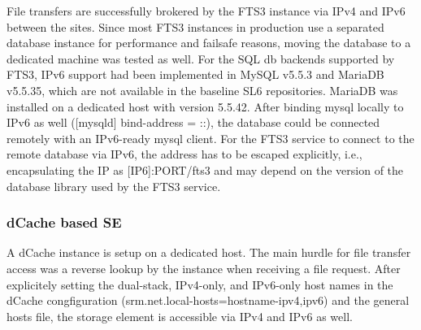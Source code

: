 File transfers are successfully brokered by the FTS3 instance via IPv4 and IPv6 between the sites. Since most FTS3 instances in production use a separated database instance for performance and failsafe reasons, moving the database to a dedicated machine was tested as well. For the SQL db backends supported by FTS3, IPv6 support had been implemented in MySQL v5.5.3 and MariaDB v5.5.35, which are not available in the baseline SL6 repositories. MariaDB was installed on a dedicated host with version 5.5.42. After binding mysql locally to IPv6 as well ([mysqld] bind-address = ::), the database could be connected remotely with an IPv6-ready mysql client. For the FTS3 service to connect to the remote database via IPv6, the address has to be escaped explicitly, i.e., encapsulating the IP as [IP6]:PORT/fts3 and may depend on the version of the database library used by the FTS3 service.

\subsubsection{dCache based SE}
A dCache instance is setup on a dedicated host. The main hurdle for file transfer access was a reverse lookup by the instance when receiving a file request. After explicitely setting the dual-stack, IPv4-only, and IPv6-only host names in the dCache congfiguration (srm.net.local-hosts=hostname-ipv4,ipv6) and the general hosts file, the storage element is accessible via IPv4 and IPv6 as well.
